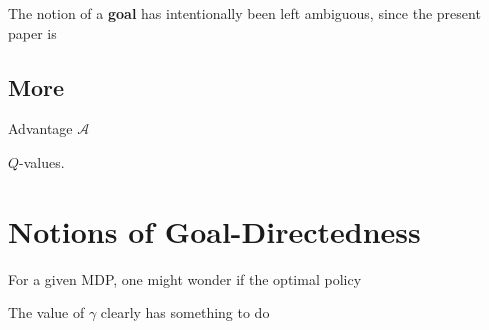 \documentclass{article}
\DeclareMathOperator*{\argmax}{\arg\max}
\DeclareMathOperator*{\Ex}{\mathbb E}
\begin{document}
    The notion of a \textbf{goal} has intentionally been left ambiguous, since the present paper is 
    
    
    
        
    
        
    
    \subsection{More }
    Advantage $\mathcal A$
    
    $Q$-values.
    
    \section{Notions of Goal-Directedness}

    
    
    For a given MDP, one might wonder if the optimal policy 

    The value of $\gamma$ clearly has something to do 
    
    
    
    
    
    
\end{document}
